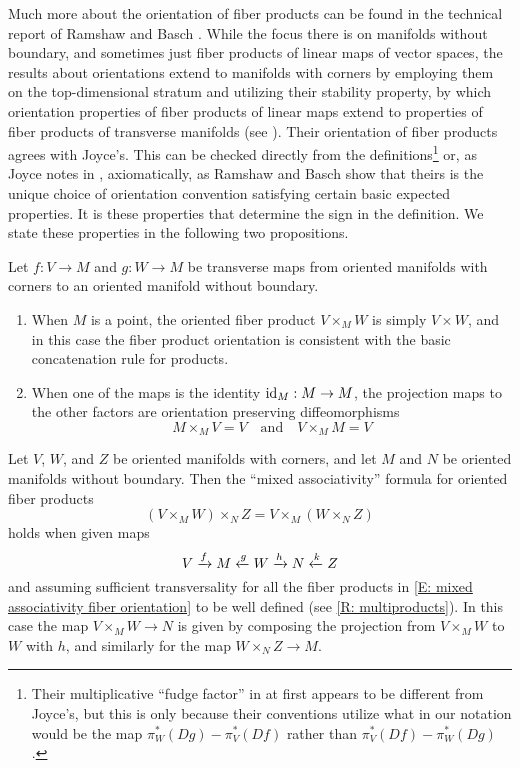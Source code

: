 Much more about the orientation of fiber products can be found in the technical report of Ramshaw and Basch \cite{RamBas09}.
While the focus there is on manifolds without boundary, and sometimes just fiber products of linear maps of vector spaces, the results about orientations extend to manifolds with corners by employing them on the top-dimensional stratum and utilizing their stability property, by which orientation properties of fiber products of linear maps extend to properties of fiber products of transverse manifolds (see \cite[Sections 6.3, 9.1.2, and 9.3]{RamBas09}).
Their orientation of fiber products agrees with Joyce's.
This can be checked directly from the definitions\footnote{Their multiplicative ``fudge factor'' in \cite[Theorem 9.14]{RamBas09} at first appears to be different from Joyce's, but this is only because their conventions utilize what in our notation would be the map $\pi_W^*(Dg)-\pi_V^*(Df)$ rather than $\pi_V^*(Df)-\pi_W^*(Dg)$.} or, as Joyce notes in \cite[Remark 7.6.iii]{Joy12}, axiomatically, as Ramshaw and Basch show that theirs is the unique choice of orientation convention satisfying certain basic expected properties.
It is these properties that determine the sign in the definition.
We state these properties in the following two propositions.

\begin{proposition}\label{P: oriented fiber product basic properties}
	Let $f:V\to M$ and $g:W\to M$ be transverse maps from oriented manifolds with corners to an oriented manifold without boundary.
	\begin{enumerate}
		\item When $M$ is a point, the oriented fiber product $V\times_M W$ is simply $V\times W$, and in this case the fiber product orientation is consistent with the basic concatenation rule for products.
		\item When one of the maps is the identity $\mathrm{id}_M:M\to M$, the projection maps to the other factors are orientation preserving diffeomorphisms
		\begin{equation*}
			M\times_M V=V\quad\text{and}\quad V\times_MM=V
		\end{equation*}
	\end{enumerate}
\end{proposition}

\begin{proposition}\label{P: oriented fiber mixed associativity}
	Let $V$, $W$, and $Z$ be oriented manifolds with corners, and let $M$ and $N$ be oriented manifolds without boundary.
	Then the ``mixed associativity'' formula for oriented fiber products
	\begin{equation}\label{E: mixed associativity fiber orientation}
		(V\times_MW)\times_N Z=V\times_M(W\times_N Z)
	\end{equation}
	holds when given maps
	$$V\xrightarrow{f} M\xleftarrow{g} W\xrightarrow{h} N\xleftarrow{k} Z$$
	and assuming sufficient transversality for all the fiber products in \eqref{E: mixed associativity fiber orientation} to be well defined (see \cref{R: multiproducts}).
	In this case the map $V\times_MW\to N$ is given by composing the projection from $V\times_MW$ to $W$ with $h$, and similarly for the map $W\times_N Z\to M$.
\end{proposition}

